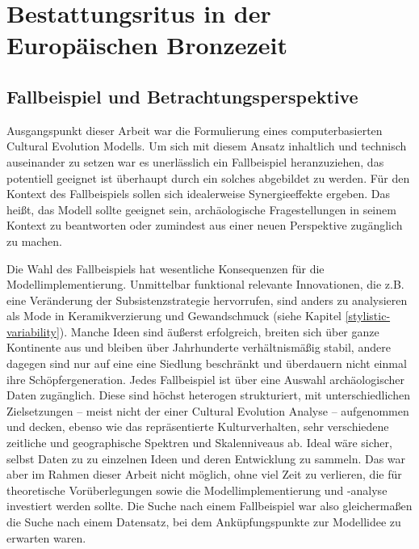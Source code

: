 \documentclass[openany,twoside,twocolumn]{book}
\let\pby\printbibliography
\renewcommand{\printbibliography}{}
\begin{document}
\newpage
\pby[title={Literatur},segment=\therefsegment,heading=subbibintoc]

\hypertarget{bronze-age-burial-rites}{%
\chapter{Bestattungsritus in der Europäischen
Bronzezeit}\label{bronze-age-burial-rites}}

\hypertarget{fallbeispiel-und-betrachtungsperspektive}{%
\section{Fallbeispiel und
Betrachtungsperspektive}\label{fallbeispiel-und-betrachtungsperspektive}}

Ausgangspunkt dieser Arbeit war die Formulierung eines computerbasierten
Cultural Evolution Modells. Um sich mit diesem Ansatz inhaltlich und
technisch auseinander zu setzen war es unerlässlich ein Fallbeispiel
heranzuziehen, das potentiell geeignet ist überhaupt durch ein solches
abgebildet zu werden. Für den Kontext des Fallbeispiels sollen sich
idealerweise Synergieeffekte ergeben. Das heißt, das Modell sollte
geeignet sein, archäologische Fragestellungen in seinem Kontext zu
beantworten oder zumindest aus einer neuen Perspektive zugänglich zu
machen.

Die Wahl des Fallbeispiels hat wesentliche Konsequenzen für die
Modellimplementierung. Unmittelbar funktional relevante Innovationen,
die z.B. eine Veränderung der Subsistenzstrategie hervorrufen, sind
anders zu analysieren als Mode in Keramikverzierung und Gewandschmuck
(siehe Kapitel \ref{stylistic-variability}). Manche Ideen sind äußerst
erfolgreich, breiten sich über ganze Kontinente aus und bleiben über
Jahrhunderte verhältnismäßig stabil, andere dagegen sind nur auf eine
eine Siedlung beschränkt und überdauern nicht einmal ihre
Schöpfergeneration. Jedes Fallbeispiel ist über eine Auswahl
archäologischer Daten zugänglich. Diese sind höchst heterogen
strukturiert, mit unterschiedlichen Zielsetzungen -- meist nicht der
einer Cultural Evolution Analyse -- aufgenommen und decken, ebenso wie
das repräsentierte Kulturverhalten, sehr verschiedene zeitliche und
geographische Spektren und Skalenniveaus ab. Ideal wäre sicher, selbst
Daten zu zu einzelnen Ideen und deren Entwicklung zu sammeln. Das war
aber im Rahmen dieser Arbeit nicht möglich, ohne viel Zeit zu verlieren,
die für theoretische Vorüberlegungen sowie die Modellimplementierung und
-analyse investiert werden sollte. Die Suche nach einem Fallbeispiel war
also gleichermaßen die Suche nach einem Datensatz, bei dem
Anküpfungspunkte zur Modellidee zu erwarten waren.
\end{document}
